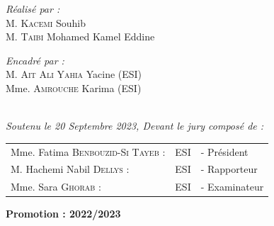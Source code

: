 \documentclass[a4paper,12pt]{report}
\begin{document}
\begin{titlepage}
\noindent
\begin{minipage}{0.5\textwidth}
  \begin{flushleft} \large
    \emph{Réalisé par :}\\
    M. \textsc{Kacemi} Souhib \\
    M. \textsc{Taibi} Mohamed Kamel Eddine \\
  \end{flushleft}
\end{minipage}
\begin{minipage}{0.45\textwidth}
  \begin{flushright} \large
    \begin{flushleft} \large
    \emph{Encadré par :} \\
    M. \textsc{Ait Ali Yahia} Yacine (ESI)\\[0.1cm]
    Mme. \textsc{Amrouche} Karima (ESI)\\[0.1cm]
    \end{flushleft}

  \end{flushright}
\end{minipage}\\[1cm]


{\large \textit{Soutenu le 20 Septembre 2023, Devant le jury composé de : }}\\[0.5cm]

\centering
\begin{tabular}{lll}
\large Mme. Fatima \textsc{Benbouzid-Si Tayeb} : & \large ESI & \large - Président \\[0.1cm]
\large M. Hachemi Nabil \textsc{Dellys} : & \large ESI & \large - Rapporteur \\[0.1cm]
\large Mme. Sara \textsc{Ghorab} : & \large ESI & \large - Examinateur
\end{tabular}



\vspace{20mm}
{\large \bfseries Promotion : 2022/2023}

\end{titlepage}
\end{document}
